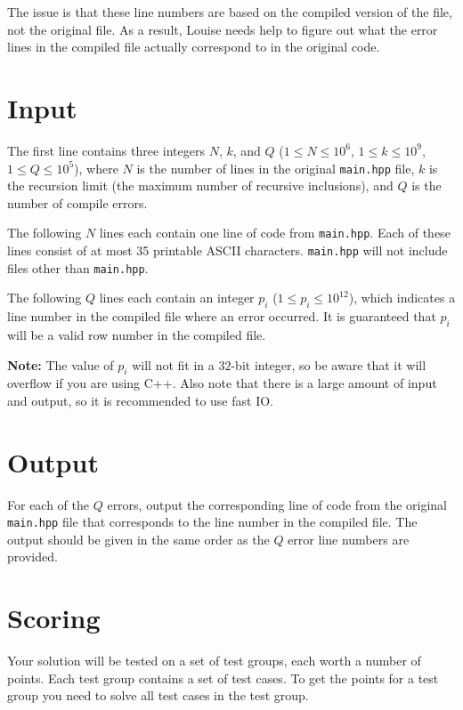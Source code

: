 The issue is that these line numbers are based on the compiled version of the file, not the original file.
As a result, Louise needs help to figure out what the error lines in the compiled file actually correspond
to in the original code.

\section*{Input}
\noindent
The first line contains three integers $N$, $k$, and $Q$
($1 \leq N \leq 10^6$, $1 \leq k \leq 10^9$, $1 \leq Q \leq 10^5$), where
$N$ is the number of lines in the original \texttt{main.hpp} file, 
$k$ is the recursion limit (the maximum number of recursive inclusions), and $Q$ is the number of compile errors.

The following $N$ lines each contain one line of code from \texttt{main.hpp}. Each of these lines consist of at most
35 printable ASCII characters. \texttt{main.hpp} will not include files other than \texttt{main.hpp}.

The following $Q$ lines each contain an integer $p_i$ ($1 \leq p_i \leq 10^{12}$), which indicates a line number in
the compiled file where an error occurred. It is guaranteed that $p_i$ will be a valid row number in the compiled file.

\textbf{Note: } The value of $p_i$ will not fit in a $32$-bit integer, so be aware that it will
overflow if you are using C++. Also note that there is a large amount of input and output, so it is
recommended to use fast IO.

\section*{Output}
\noindent
For each of the $Q$ errors, output the corresponding line of code from the original \texttt{main.hpp}
file that corresponds to the line number in the compiled file. 
The output should be given in the same order as the $Q$ error line numbers are provided.


\section*{Scoring}
Your solution will be tested on a set of test groups, each worth a number of points. Each test group contains
a set of test cases. To get the points for a test group you need to solve all test cases in the test group.

